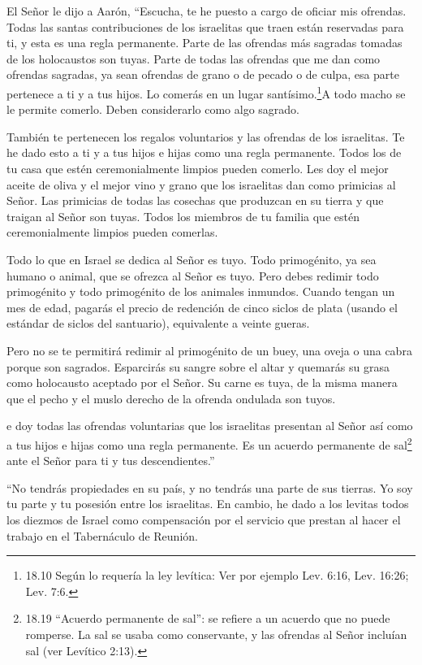  El Señor le dijo a Aarón, ``Escucha, te he puesto a cargo
de oficiar mis ofrendas. Todas las santas contribuciones de los
israelitas que traen están reservadas para ti, y esta es una regla
permanente.  Parte de las ofrendas más sagradas tomadas de
los holocaustos son tuyas. Parte de todas las ofrendas que me dan como
ofrendas sagradas, ya sean ofrendas de grano o de pecado o de culpa, esa
parte pertenece a ti y a tus hijos.  Lo comerás en un lugar
santísimo.\footnote{18.10 Según lo requería la ley levítica: Ver por
  ejemplo Lev. 6:16, Lev. 16:26; Lev. 7:6.}A todo macho se le permite
comerlo. Deben considerarlo como algo sagrado.

 También te pertenecen los regalos voluntarios y las
ofrendas de los israelitas. Te he dado esto a ti y a tus hijos e hijas
como una regla permanente. Todos los de tu casa que estén
ceremonialmente limpios pueden comerlo.  Les doy el mejor
aceite de oliva y el mejor vino y grano que los israelitas dan como
primicias al Señor.  Las primicias de todas las cosechas
que produzcan en su tierra y que traigan al Señor son tuyas. Todos los
miembros de tu familia que estén ceremonialmente limpios pueden
comerlas.

 Todo lo que en Israel se dedica al Señor es tuyo.
 Todo primogénito, ya sea humano o animal, que se ofrezca
al Señor es tuyo. Pero debes redimir todo primogénito y todo primogénito
de los animales inmundos.  Cuando tengan un mes de edad,
pagarás el precio de redención de cinco siclos de plata (usando el
estándar de siclos del santuario), equivalente a veinte gueras.

 Pero no se te permitirá redimir al primogénito de un buey,
una oveja o una cabra porque son sagrados. Esparcirás su sangre sobre el
altar y quemarás su grasa como holocausto aceptado por el Señor.
 Su carne es tuya, de la misma manera que el pecho y el
muslo derecho de la ofrenda ondulada son tuyos.

 e doy todas las ofrendas voluntarias que los israelitas
presentan al Señor así como a tus hijos e hijas como una regla
permanente. Es un acuerdo permanente de sal\footnote{18.19 ``Acuerdo
  permanente de sal'': se refiere a un acuerdo que no puede romperse. La
  sal se usaba como conservante, y las ofrendas al Señor incluían sal
  (ver Levítico 2:13).} ante el Señor para ti y tus descendientes.''

 ``No tendrás propiedades en su país, y no tendrás una
parte de sus tierras. Yo soy tu parte y tu posesión entre los
israelitas.  En cambio, he dado a los levitas todos los
diezmos de Israel como compensación por el servicio que prestan al hacer
el trabajo en el Tabernáculo de Reunión.

